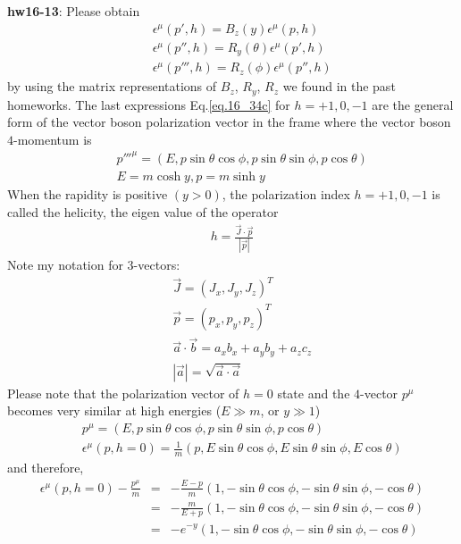 \documentclass[12pt]{article}
\def\eps{\epsilon}
\begin{document}
{\bf hw16-13}: Please obtain
\begin{eqnarray}
&& \eps^\mu(p',h)   = B_z(y)   \eps^\mu(p,h) \label{eq.16_34a} \\
&& \eps^\mu(p{''},h)  = R_y(\theta) \eps^\mu(p',h) \label{eq.16_34b} \\
&& \eps^\mu(p{'''},h) = R_z(\phi)   \eps^\mu(p{''},h) \label{eq.16_34c} 
\end{eqnarray}
by using the matrix representations of $B_z$, $R_y$, $R_z$ we found in the
past homeworks. The last expressions Eq.\ref{eq.16_34c} for $h=+1,0,-1$ are the
general form of the vector boson polarization vector in the frame
where the vector boson $4$-momentum is
\begin{eqnarray}
  && p{'''}^\mu = (E,p\sin\theta\cos\phi,p\sin\theta\sin\phi,p\cos\theta)\label{eq.16_35a} \\
  && E = m\cosh y, p = m\sinh y \label{eq.16_35b}
\end{eqnarray}
When the rapidity is positive $(y>0)$, the polarization index $h=+1,0,-1$
is called the helicity, the eigen value of the operator
\begin{eqnarray}
  h=\frac{ {\vec J}\cdot {\vec p}}{|{\vec p}|} \label{eq.16_36}
\end{eqnarray}
Note my notation for $3$-vectors:
\begin{eqnarray}
&& {\vec J} = (J_x, J_y, J_z)^T \label{eq.16_37a} \\
&&{\vec p} = (p_x, p_y, p_z)^T \label{eq.16_37b} \\
&&{\vec a} \cdot {\vec b} = a_x b_x + a_y b_y + a_z c_z \label{eq.16_37c} \\
&& |{\vec a}| = \sqrt{ {\vec a}\cdot {\vec a} } \label{eq.16_37d}
\end{eqnarray}
Please note that the polarization vector of $h=0$ state and the $4$-vector
$p^\mu$ becomes very similar at high energies ($E \gg m$, or $y \gg 1$)
\begin{eqnarray}
&&p^\mu
= (E, p\sin\theta\cos\phi, p\sin\theta\sin\phi, p\cos\theta) \label{eq.16_38a} \\
&&\eps^\mu(p,h=0)
= \frac{1}{m}(p, E\sin\theta\cos\phi, E\sin\theta\sin\phi, E\cos\theta)  \label{eq.16_38b}
\end{eqnarray}
and therefore,
\begin{eqnarray}
  \eps^\mu(p,h=0) - \frac{p^\mu}{m}
&=& -\frac{E-p}{m} (1, -\sin\theta\cos\phi, -\sin\theta\sin\phi, -\cos\theta) \\
&=& -\frac{m}{E+p} (1, -\sin\theta\cos\phi, -\sin\theta\sin\phi, -\cos\theta) \\
&=& -e^{-y}  (1, -\sin\theta\cos\phi, -\sin\theta\sin\phi, -\cos\theta) \label{eq.16_39}
\end{eqnarray}
\end{document}
